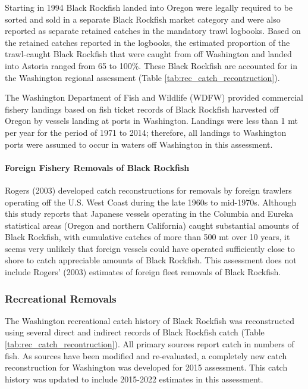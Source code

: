 \documentclass[11pt,
  english,
  letterpaper,
]{article}
\begin{document}
Starting in 1994 Black Rockfish landed into Oregon were legally required to be sorted and sold in a separate Black Rockfish market category and were also reported as separate retained catches in the mandatory trawl logbooks. Based on the retained catches reported in the logbooks, the estimated proportion of the trawl-caught Black Rockfish that were caught from off Washington and landed into Astoria ranged from 65 to 100\%. These Black Rockfish are accounted for in the Washington regional assessment (Table \ref{tab:rec_catch_recontruction}).

The Washington Department of Fish and Wildlife (WDFW) provided commercial fishery landings based on fish ticket records of Black Rockfish harvested off Oregon by vessels landing at ports in Washington. Landings were less than 1 mt per year for the period of 1971 to 2014; therefore, all landings to Washington ports were assumed to occur in waters off Washington in this assessment.

\hypertarget{foreign-fishery-removals-of-black-rockfish}{%
\paragraph{Foreign Fishery Removals of Black Rockfish}\label{foreign-fishery-removals-of-black-rockfish}}

Rogers (2003) developed catch reconstructions for removals by foreign trawlers operating off the U.S. West Coast during the late 1960s to mid-1970s. Although this study reports that Japanese vessels operating in the Columbia and Eureka statistical areas (Oregon and northern California) caught substantial amounts of Black Rockfish, with cumulative catches of more than 500 mt over 10 years, it seems very unlikely that foreign vessels could have operated sufficiently close to shore to catch appreciable amounts of Black Rockfish. This assessment does not include Rogers' (2003) estimates of foreign fleet removals of Black Rockfish.

\hypertarget{recreational-removals}{%
\subsubsection{Recreational Removals}\label{recreational-removals}}

The Washington recreational catch history of Black Rockfish was reconstructed using several direct and indirect records of Black Rockfish catch (Table \ref{tab:rec_catch_recontruction}). All primary sources report catch in numbers of fish. As sources have been modified and re-evaluated, a completely new catch reconstruction for Washington was developed for 2015 assessment. This catch history was updated to include 2015-2022 estimates in this assessment.
\end{document}
